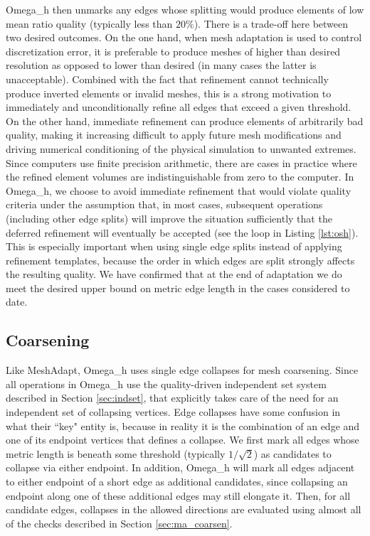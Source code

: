 Omega\_h then unmarks any edges whose splitting
would produce elements of low mean ratio quality (typically less than $20\%$).
There is a trade-off here between two desired outcomes.
On the one hand, when mesh adaptation is used to control discretization
error, it is preferable to produce meshes of higher than desired resolution
as opposed to lower than desired (in many cases the latter is unacceptable).
Combined with the fact that refinement cannot technically produce
inverted elements or invalid meshes, this is a strong motivation to immediately
and unconditionally refine all edges that exceed a given threshold.
On the other hand, immediate refinement can produce elements of arbitrarily
bad quality, making it increasing difficult to apply future mesh modifications
and driving numerical conditioning of the physical simulation to unwanted extremes.
Since computers use finite precision arithmetic, there are cases in practice
where the refined element volumes are indistinguishable from zero to the computer.
In Omega\_h, we choose to avoid immediate refinement that would violate
quality criteria under the assumption that, in most cases, subsequent
operations (including other edge splits) will improve the situation
sufficiently that the deferred refinement will eventually be accepted
(see the loop in Listing \ref{lst:osh}).
This is especially important when using single edge splits instead of
applying refinement templates, because the order in which edges are split
strongly affects the resulting quality.
We have confirmed that at the end of adaptation we do meet the desired
upper bound on metric edge length in the cases considered to date.

\subsection{Coarsening}
\label{sec:osh_coarsen}

Like MeshAdapt, Omega\_h uses single edge collapses
for mesh coarsening.
Since all operations in Omega\_h use the quality-driven
independent set system described in Section \ref{sec:indset},
that explicitly takes care of the need for an independent
set of collapsing vertices.
Edge collapses have some confusion in what their ``key" entity is,
because in reality it is the combination of an edge and one
of its endpoint vertices that defines a collapse.
We first mark all edges whose metric length is beneath
some threshold (typically $1/\sqrt{2}$) as candidates to collapse
via either endpoint.
In addition, Omega\_h will mark all edges adjacent to either endpoint
of a short edge as additional candidates, since collapsing an endpoint
along one of these additional edges may still elongate it.
Then, for all candidate edges, collapses in the allowed directions are evaluated
using almost all of the checks described in Section \ref{sec:ma_coarsen}.

